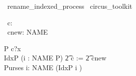 \begin{zsection}
  \SECTION\ rename\_indexed\_process \parents\ circus\_toolkit
\end{zsection}

\begin{zed}
   [NAME]
\end{zed}

\begin{circus}
     \circchannel\ c: \nat \\
     \circchannel\ cnew: NAME \cross \nat
\end{circus}

\begin{circus}
   \circprocess P \circdef \circbegin \circspot c?x \then \Skip \circend \\
   \circprocess IdxP \circdef (i : NAME \circindex P) \lcircrename \t2 c := \t2 cnew \rcircrename \\
   \circprocess Purses \circdef \Interleave i: NAME \circspot (IdxP \lcircindex i \rcircindex)
\end{circus}


